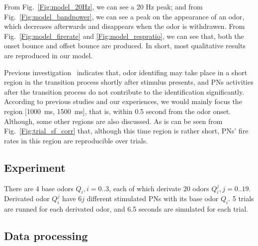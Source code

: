 \documentclass[12pt, a4paper]{article}
\begin{document}
From Fig.~\ref{Fig:model_20Hz}, we can see a 20 Hz peak; and from Fig.~\ref{Fig:model_bandpower}, we can see a peak on the appearance of an odor, which decreases afterwards and disappears when the odor is withdrawen. From Fig.~\ref{Fig:model_firerate} and \ref{Fig:model_respratio}, we can see that, both the onset bounce and offset bounce are produced. In short, most qualitative results are reproduced in our model.


Previous investigation~\citep{Mazor2005} indicates that, odor identifing may take place in a short region in the transition process shortly after stimulus presents, and PNs activities after the transition process do not contribute to the identification significantly. %
According to previous studies and our experiences, we would mainly focus the region {[1000~ms, 1500~ms]}, that is, within 0.5 second from the odor onset. Although, some other regions are also discussed. As is can be seen from Fig.~\ref{Fig:trial_sf_corr} that, although this time region is rather short, PNs' fire rates in this region are reproducible over trials.



\subsection*{Experiment} \label{Sect:experiment}
There are 4 base odors $Q_i, i=0..3$, each of which derivate 20 odors $Q_i^j, j=0..19$. Derivated odor $Q_i^j$ have $6j$ different stimulated PNs with its base odor $Q_i$. 5 trials are runned for each derivated odor, and 6.5 seconds are simulated for each trial.

\subsection*{Data processing} \label{Sect:data_proc}
 \cdots
\end{document}
